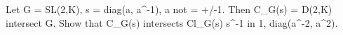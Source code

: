 Let G = SL(2,K), s = diag(a, a^{-1}), a not = +/-1. Then C_G(s) = D(2,K) intersect G. Show that C_G(s) intersects Cl_G(s) s^{-1} in {1, diag(a^{-2}, a^2)}.
